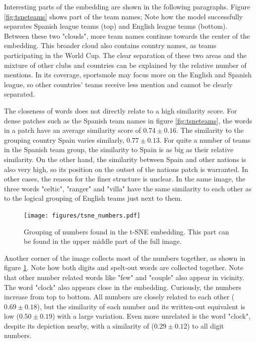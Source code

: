 \documentclass[10pt, a4paper]{UUThesisTemplate}
\begin{document}
Interesting parts of the embedding are shown in the following paragraphs. Figure \ref{fig:tsneteams} shows part of the team names; Note how the model successfully separates Spanish league teams (top) and English league teams (bottom). Between these two "clouds", more team names continue towards the center of the embedding. This broader cloud also contains country names, as teams participating in the World Cup. The clear separation of these two areas and the mixture of other clubs and countries can be explained by the relative number of mentions. In its coverage, sportsmole may focus more on the English and Spanish league, so other countries' teams receive less mention and cannot be clearly separated.

The closeness of words does not directly relate to a high similarity score. For dense patches such as the Spanish team names in figure \ref{fig:tsneteams}, the words in a patch have an average similarity score of $0.74\pm0.16$. The similarity to the grouping country Spain varies similarly, $0.77\pm 0.13$. For quite a number of teams in the Spanish team group, the similarity to Spain is as big as their relative similarity. On the other hand, the similarity between Spain and other nations is also very high, so its position on the outset of the nations patch is warranted. In other cases, the reason for the finer structure is unclear. In the same image, the three words "celtic", "ranger" and "villa" have the same similarity to each other as to the logical grouping of English teams just next to them.

\begin{figure}
\vspace{-2cm}
\texttt{[image: figures/tsne\_numbers.pdf]}
\vspace{-2cm}
\caption{Grouping of numbers found in the t-SNE embedding. This part can be found in the upper middle part of the full image.}\label{fig:tsnenumbers}
\end{figure}

Another corner of the image collects most of the numbers together, as shown in figure \ref{fig:tsnenumbers}. Note how both digits and spelt-out words are collected together. Note that other number related words like "few" and "couple" also appear in vicinity. The word "clock" also appears close in the embedding. Curiously, the numbers increase from top to bottom. All numbers are closely related to each other ($0.69\pm0.18$), but the similarity of each number and its written-out equivalent is low ($0.50 \pm 0.19$) with a large variation. Even more unrelated is the word "clock", despite its depiction nearby, with a similarity of ($0.29\pm0.12$) to all digit numbers. 
\end{document}
